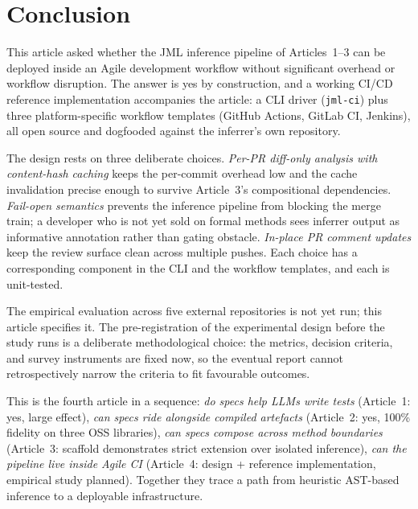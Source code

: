 \section{Conclusion}
\label{sec:conclusion}

This article asked whether the JML inference pipeline of Articles~1--3 can be deployed inside an Agile development workflow without significant overhead or workflow disruption. The answer is yes by construction, and a working CI/CD reference implementation accompanies the article: a CLI driver ({\tt jml-ci}) plus three platform-specific workflow templates (GitHub Actions, GitLab CI, Jenkins), all open source and dogfooded against the inferrer's own repository.

The design rests on three deliberate choices. \emph{Per-PR diff-only analysis with content-hash caching} keeps the per-commit overhead low and the cache invalidation precise enough to survive Article~3's compositional dependencies. \emph{Fail-open semantics} prevents the inference pipeline from blocking the merge train; a developer who is not yet sold on formal methods sees inferrer output as informative annotation rather than gating obstacle. \emph{In-place PR comment updates} keep the review surface clean across multiple pushes. Each choice has a corresponding component in the CLI and the workflow templates, and each is unit-tested.

The empirical evaluation across five external repositories is not yet run; this article specifies it. The pre-registration of the experimental design before the study runs is a deliberate methodological choice: the metrics, decision criteria, and survey instruments are fixed now, so the eventual report cannot retrospectively narrow the criteria to fit favourable outcomes.

This is the fourth article in a sequence: \emph{do specs help LLMs write tests} (Article~1: yes, large effect), \emph{can specs ride alongside compiled artefacts} (Article~2: yes, 100\% fidelity on three OSS libraries), \emph{can specs compose across method boundaries} (Article~3: scaffold demonstrates strict extension over isolated inference), \emph{can the pipeline live inside Agile CI} (Article~4: design + reference implementation, empirical study planned). Together they trace a path from heuristic AST-based inference to a deployable infrastructure.
